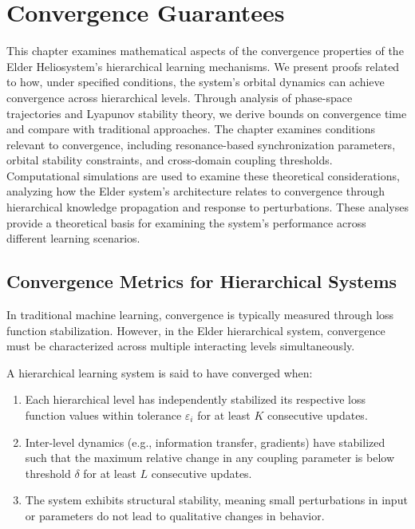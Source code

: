 \chapter{Convergence Guarantees}

\begin{tcolorbox}[colback=blue!5!white,colframe=blue!75!black,title=Chapter Summary]
This chapter examines mathematical aspects of the convergence properties of the Elder Heliosystem's hierarchical learning mechanisms. We present proofs related to how, under specified conditions, the system's orbital dynamics can achieve convergence across hierarchical levels. Through analysis of phase-space trajectories and Lyapunov stability theory, we derive bounds on convergence time and compare with traditional approaches. The chapter examines conditions relevant to convergence, including resonance-based synchronization parameters, orbital stability constraints, and cross-domain coupling thresholds. Computational simulations are used to examine these theoretical considerations, analyzing how the Elder system's architecture relates to convergence through hierarchical knowledge propagation and response to perturbations. These analyses provide a theoretical basis for examining the system's performance across different learning scenarios.
\end{tcolorbox}

\section{Convergence Metrics for Hierarchical Systems}



In traditional machine learning, convergence is typically measured through loss function stabilization. However, in the Elder hierarchical system, convergence must be characterized across multiple interacting levels simultaneously.

\begin{definition}
A hierarchical learning system is said to have converged when:
\begin{enumerate}
    \item Each hierarchical level has independently stabilized its respective loss function values within tolerance $\varepsilon_i$ for at least $K$ consecutive updates.
    \item Inter-level dynamics (e.g., information transfer, gradients) have stabilized such that the maximum relative change in any coupling parameter is below threshold $\delta$ for at least $L$ consecutive updates.
    \item The system exhibits structural stability, meaning small perturbations in input or parameters do not lead to qualitative changes in behavior.
\end{enumerate}
\end{definition}

